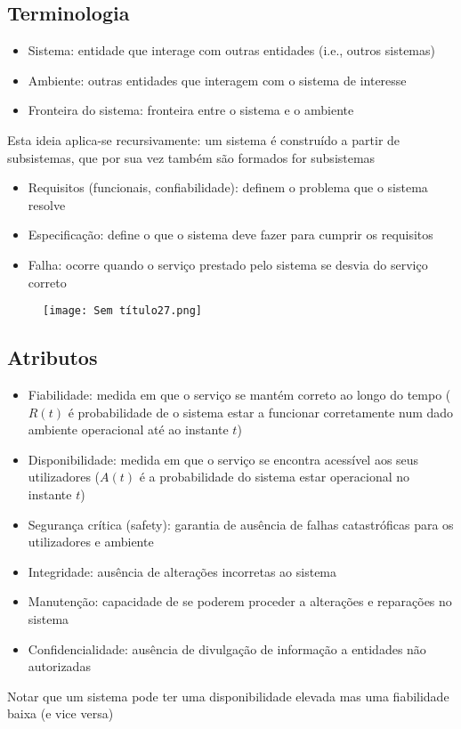 \documentclass[10pt,a4paper]{report}
\begin{document}
\subsection{Terminologia}
\begin{itemize}
\item Sistema: entidade que interage com outras entidades (i.e., outros sistemas)
\item Ambiente: outras entidades que interagem com o sistema de interesse
\item Fronteira do sistema: fronteira entre o sistema e o ambiente
\end{itemize}
Esta ideia aplica-se recursivamente: um sistema é construído a partir de subsistemas, que por sua vez também são formados for subsistemas
\begin{itemize}
\item Requisitos (funcionais, confiabilidade): definem o problema que o sistema resolve
\item Especificação: define o que o sistema deve fazer para cumprir os requisitos
\item Falha: ocorre quando o serviço prestado pelo sistema se desvia do serviço correto
\end{itemize}
\begin{figure}[H]
\centering
\texttt{[image: Sem título27.png]}
\end{figure}
\subsection{Atributos}
\begin{itemize}
\item Fiabilidade: medida em que o serviço se mantém correto ao longo do tempo ($R(t)$ é probabilidade de o sistema estar a funcionar corretamente num dado ambiente operacional até ao instante $t$)
\item Disponibilidade: medida em que o serviço se encontra acessível aos seus utilizadores ($A(t)$ é a probabilidade do sistema estar operacional no instante $t$)
\item Segurança crítica (safety): garantia de ausência de falhas catastróficas para os utilizadores e ambiente
\item Integridade: ausência de alterações incorretas ao sistema
\item Manutenção: capacidade de se poderem proceder a alterações e reparações no sistema
\item Confidencialidade: ausência de divulgação de informação a entidades não autorizadas
\end{itemize}
Notar que um sistema pode ter uma disponibilidade elevada mas uma fiabilidade baixa (e vice versa)
\end{document}
